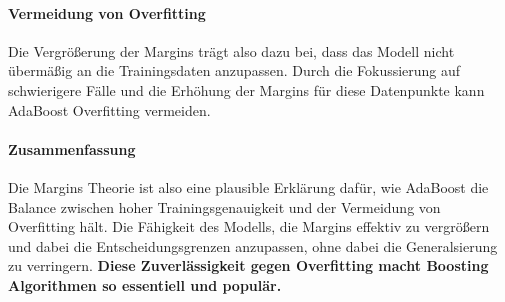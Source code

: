 \paragraph{Vermeidung von Overfitting}
Die Vergrößerung der Margins trägt also dazu bei, dass das Modell nicht übermäßig an die Trainingsdaten anzupassen. Durch die Fokussierung auf schwierigere Fälle und die Erhöhung der Margins für diese Datenpunkte kann AdaBoost Overfitting vermeiden. 

\paragraph{Zusammenfassung}
Die Margins Theorie ist also eine plausible Erklärung dafür, wie AdaBoost die Balance zwischen hoher Trainingsgenauigkeit und der Vermeidung von Overfitting hält. Die Fähigkeit des Modells, die Margins effektiv zu vergrößern und dabei die Entscheidungsgrenzen anzupassen, ohne dabei die Generalsierung zu verringern. \textbf{Diese Zuverlässigkeit gegen Overfitting macht Boosting Algorithmen so essentiell und populär.}

